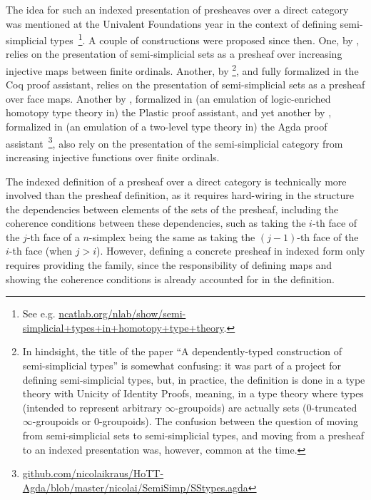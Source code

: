 \documentclass{msc}
\begin{document}
The idea for such an indexed presentation of presheaves over a direct category was mentioned at the Univalent Foundations year in the context of defining semi-simplicial types~\footnote{See e.g. \href{https://ncatlab.org/nlab/show/semi-simplicial+types+in+homotopy+type+theory}{ncatlab.org/nlab/show/semi-simplicial+types+in+homotopy+type+theory}.}. A couple of constructions were proposed since then. One, by \cite{voevodsky12}, relies on the presentation of semi-simplicial sets as a presheaf over increasing injective maps between finite ordinals. Another, by \cite{herbelin15}\footnote{In hindsight, the title of the paper ``A dependently-typed construction of semi-simplicial types'' is somewhat confusing: it was part of a project for defining semi-simplicial types, but, in practice, the definition is done in a type theory with Unicity of Identity Proofs, meaning, in a type theory where types (intended to represent arbitrary $\infty$-groupoids) are actually sets ($0$-truncated $\infty$-groupoids or $0$-groupoids). The confusion between the question of moving from semi-simplicial sets to semi-simplicial types, and moving from a presheaf to an indexed presentation was, however, common at the time.}, and fully formalized in the Coq proof assistant, relies on the presentation of semi-simplicial sets as a presheaf over face maps. Another by \cite{part15}, formalized in (an emulation of logic-enriched homotopy type theory in) the Plastic proof assistant, and yet another by \cite{annenkovCK17}, formalized in (an emulation of a two-level type theory in) the Agda proof assistant~\footnote{\href{https://github.com/nicolaikraus/HoTT-Agda/blob/master/nicolai/SemiSimp/SStypes.agda}{github.com/nicolaikraus/HoTT-Agda/blob/master/nicolai/SemiSimp/SStypes.agda}}, also rely on the presentation of the semi-simplicial category from increasing injective functions over finite ordinals.

The indexed definition of a presheaf over a direct category is technically more involved than the presheaf definition, as it requires hard-wiring in the structure the dependencies between elements of the sets of the presheaf, including the coherence conditions between these dependencies, such as taking the $i$-th face of the $j$-th face of a $n$-simplex being the same as taking the $(j-1)$-th face of the $i$-th face (when $j>i$). However, defining a concrete presheaf in indexed form only requires providing the family, since the responsibility of defining maps and showing the coherence conditions is already accounted for in the definition.
\end{document}
